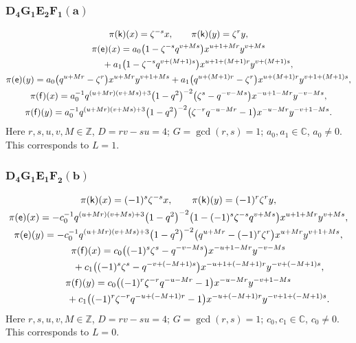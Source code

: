\documentclass[10pt,a4paper]{amsart}
\numberwithin{equation}{section}
\begin{document}
\subsubsection*{$\boldsymbol{D_4G_1E_2F_1(a)}$}
\begin{gather*}
\pi(\mathsf{k})(x)= \zeta^{-s}x ,\qquad\pi(\mathsf{k})(y)=\zeta^ry ,\\
\pi(\mathsf{e})(x)= a_0\big(1-\zeta^{-s}q^{v+Ms}\big)x^{u+1+Mr}y^{v+Ms}\\
\hphantom{\pi(\mathsf{e})(x)=}{}+ a_1\big(1-\zeta^{-s}q^{v+(M+1)s}\big)x^{u+1+(M+1)r}y^{v+(M+1)s} ,\\
\pi(\mathsf{e})(y)= a_0\big(q^{u+Mr}-\zeta^r\big)x^{u+Mr}y^{v+1+Ms}+ a_1\big(q^{u+(M+1)r}-\zeta^r\big)x^{u+(M+1)r}y^{v+1+(M+1)s} ,\\
\pi(\mathsf{f})(x)= a_0^{-1}q^{(u+Mr)(v+Ms)+3}\big(1-q^2\big)^{-2}\big(\zeta^s-q^{-v-Ms}\big)x^{-u+1-Mr}y^{-v-Ms} ,\\
\pi(\mathsf{f})(y)= a_0^{-1}q^{(u+Mr)(v+Ms)+3}\big(1-q^2\big)^{-2}\big(\zeta^{-r}q^{-u-Mr}-1\big)x^{-u-Mr}y^{-v+1-Ms} .
\end{gather*}
Here $r,s,u,v,M\in\mathbb{Z}$, $D=rv-su=4$; $G=\operatorname{gcd}(r,s)=1$; $a_0,a_1\in\mathbb{C}$, $a_0\ne 0$. This corresponds to $L=1$.

\subsubsection*{$\boldsymbol{D_4G_1E_1F_2(b)}$}
\begin{gather*}
\pi(\mathsf{k})(x)= (-1)^s\zeta^{-s}x ,\qquad\pi(\mathsf{k})(y)=(-1)^r\zeta^ry ,\\
\pi(\mathsf{e})(x)= -c_0^{-1}q^{(u+Mr)(v+Ms)+3}\big(1-q^2\big)^{-2}\big(1-(-1)^s\zeta^{-s}q^{v+Ms}\big)x^{u+1+Mr}y^{v+Ms} ,\\
\pi(\mathsf{e})(y)= -c_0^{-1}q^{(u+Mr)(v+Ms)+3}\big(1-q^2\big)^{-2}\big(q^{u+Mr}-(-1)^r\zeta^r\big)x^{u+Mr}y^{v+1+Ms} ,\\
\pi(\mathsf{f})(x)= c_0\big((-1)^s\zeta^s-q^{-v-Ms}\big)x^{-u+1-Mr}y^{-v-Ms}\\
\hphantom{\pi(\mathsf{f})(x)=}{}+ c_1\big((-1)^s\zeta^s-q^{-v+(-M+1)s}\big)x^{-u+1+(-M+1)r}y^{-v+(-M+1)s} ,\\
\pi(\mathsf{f})(y)= c_0\big((-1)^r\zeta^{-r}q^{-u-Mr}-1\big)x^{-u-Mr}y^{-v+1-Ms}\\
\hphantom{\pi(\mathsf{f})(y)=}{} + c_1\big((-1)^r\zeta^{-r}q^{-u+(-M+1)r}-1\big)x^{-u+(-M+1)r}y^{-v+1+(-M+1)s} .
\end{gather*}
Here $r,s,u,v,M\in\mathbb{Z}$, $D=rv-su=4$; $G=\operatorname{gcd}(r,s)=1$; $c_0,c_1\in\mathbb{C}$, $c_0\ne 0$. This corresponds to $L=0$.
\end{document}
